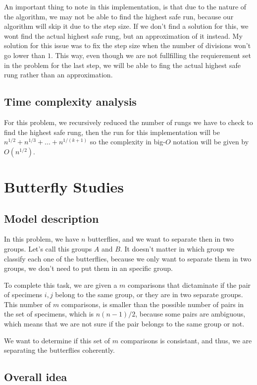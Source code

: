 \documentclass{article}
\begin{document}
An important thing to note in this implementation, is that due to the nature of the algorithm, we may not be able to find the highest safe run, because our algorithm will skip it due to the step size. If we don't find a solution for this, we wont find the actual highest safe rung, but an approximation of it instead. My solution for this issue was to fix the step size when the number of divisions won't go lower than $1$. This way, even though we are not fullfilling the requierement set in the problem for the last step, we will be able to fing the actual highest safe rung rather than an approximation.

\subsection*{Time complexity analysis}

For this problem, we recursively reduced the number of rungs we have to check to find the highest safe rung, then the run for this implementation will be $n^{1/2}+n^{1/3}+...+n^{1/(k+1)}$ so the complexity in big-$O$ notation will be given by $O(n^{1/2})$.

\section*{Butterfly Studies}

\subsection*{Model description}

In this problem, we have $n$ butterflies, and we want to separate then in two groups. Let's call this groups $A$ and $B$. It doesn't matter in which group we classify each one of the butterflies, because we only want to separate them in two groups, we don't need to put them in an specific group.

To complete this task, we are given a $m$ comparisons that dictaminate if the pair of specimens $i,j$ belong to the same group, or they are in two separate groups. This number of $m$ comparisons, is smaller than the possible number of pairs in the set of specimens, which is $n(n-1)/2$, because some pairs are ambiguous, which means that we are not sure if the pair belongs to the same group or not.

We want to determine if this set of $m$ comparisons is consistant, and thus, we are separating the butterflies coherently.

\subsection*{Overall idea}
\end{document}
